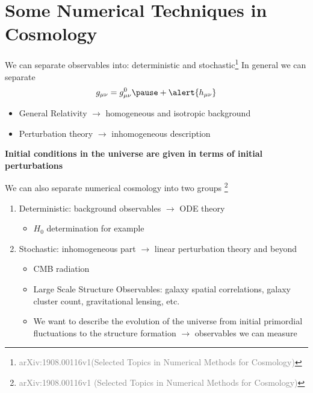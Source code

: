 \documentclass[aspectratio=169, 12pt]{beamer}
\newcommand{\gray}[1]{\textcolor{gray}{#1}}
\begin{document}
\section{Some Numerical Techniques in Cosmology}
\begin{frame}{We can separate observables into: deterministic and stochastic\footnote {\tiny{\gray{arXiv:1908.00116v1(Selected Topics in Numerical Methods for Cosmology)}}}}
In general we can separate
\begin{displaymath}
  g_{\mu\nu} = g_{\mu\nu}^{0} \pause + \alert{h_{\mu\nu}}
\end{displaymath}
\begin{itemize}
	\item General Relativity $\rightarrow$ homogeneous and isotropic background \pause 
	\item \alert{Perturbation theory} $\rightarrow$ inhomogeneous description \pause
\end{itemize}
\textbf{Initial conditions in the universe are given in terms of initial perturbations}
\end{frame}
\begin{frame}{We can also separate numerical cosmology into two groups \footnote{\tiny{\gray{arXiv:1908.00116v1 (Selected Topics in Numerical Methods for Cosmology)}}}}
\begin{enumerate}
	\item \alert{Deterministic:} background observables $\rightarrow$ ODE theory
	\begin{itemize}
		\item $H_0$ determination for example\pause
	\end{itemize}
	\item \alert{Stochastic:} inhomogeneous part $\rightarrow$ linear perturbation theory and beyond
	\begin{itemize}
		\item CMB radiation
		\item Large Scale Structure Observables: galaxy spatial correlations, galaxy cluster count, gravitational lensing, etc.
		\item We want to describe the evolution of the universe from initial primordial fluctuations to the structure formation $\rightarrow$ observables we can measure
	\end{itemize}
\end{enumerate}	
\end{frame}
\end{document}
